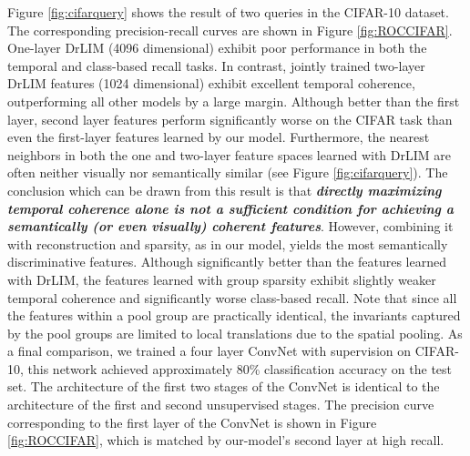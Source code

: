Figure \ref{fig:cifarquery} shows the result of two queries in the CIFAR-10
dataset. The corresponding precision-recall curves are shown in Figure
\ref{fig:ROCCIFAR}. One-layer DrLIM (4096 dimensional) exhibit poor performance
in both the temporal and class-based recall tasks. In contrast, jointly trained
two-layer DrLIM features (1024 dimensional) exhibit excellent temporal
coherence, outperforming all other models by a large margin. Although better
than the  first layer, second layer features perform significantly worse on the
CIFAR task than even the first-layer features learned by our model.
Furthermore, the nearest neighbors in both the one and two-layer feature spaces
learned with DrLIM are often neither visually nor semantically similar (see
Figure \ref{fig:cifarquery}). The conclusion which can be drawn from this
result is that \textbf{\emph{directly maximizing temporal coherence alone is
not a sufficient condition for achieving a semantically (or even visually)
coherent features}}. However, combining it with reconstruction and sparsity, as
in our model, yields the most semantically discriminative features. Although
significantly better than the features learned with DrLIM, the features learned
with group sparsity exhibit slightly weaker temporal coherence and
significantly worse class-based recall. Note that since all the features within
a pool group are practically identical, the invariants captured by the pool
groups are limited to local translations due to the spatial pooling. As a final
comparison, we trained a four layer ConvNet with supervision on CIFAR-10, this
network achieved approximately 80\% classification accuracy on the test set.
The architecture of the first two stages of the ConvNet is identical to the
architecture of the first and second unsupervised stages. The precision curve
corresponding to the first layer of the ConvNet is shown in Figure
\ref{fig:ROCCIFAR}, which is matched by our-model's second layer at high
recall. 

